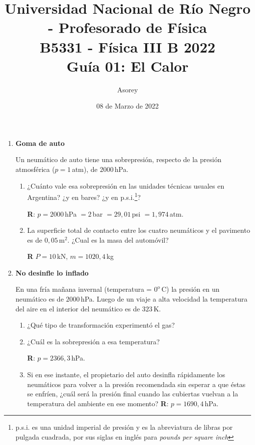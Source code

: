 \documentclass[a4paper,12pt]{article}
\begin{document}
\title{
{\normalsize{Universidad Nacional de Río Negro - Profesorado de Física}}\\
B5331 - Física III B 2022 \\ Guía 01: El Calor}
\author{Asorey }
\date{08 de Marzo de 2022}
\maketitle

\begin{enumerate}
	\setcounter{enumi}{0}

	\item {\bf{Goma de auto}}
		
		Un neumático de auto tiene una sobrepresión, respecto de la presión
		atmosférica ($p=1$\,atm), de $2000$\,hPa.
		\begin{enumerate}
			\item ¿Cuánto vale esa sobrepresión en las unidades técnicas usuales en
				Argentina? ¿y en bares? ¿y en p.s.i.\footnote{p.s.i. es una
				unidad imperial de presión y es la abreviatura de libras por
				pulgada cuadrada, por sus siglas en inglés para {\textit{pounds
				per square inch}}}? 
				
				{\bf R}: $p=2000$\,hPa $= 2$\,bar $= 29,01$\,psi $= 1,974$\,atm.
			\item La superficie total de contacto entre los cuatro neumáticos y
				el pavimento es de $0,05$\,m$^2$. ¿Cual es la masa del
				automóvil?
				
				{\bf R} $P = 10$\,kN, $m=1020,4$\,kg
		\end{enumerate}
	
	\item {\bf{No desinfle lo inflado}}
		
		En una fría mañana invernal (temperatura = $0^\mathrm{o}$\,C) la
		presión en un neumático es de $2000$\,hPa. Luego de un viaje a alta
		velocidad la temperatura del aire en el interior del neumático es de
		$323$\,K.
		\begin{enumerate}
			\item ¿Qué tipo de transformación experimentó el gas?
			\item ¿Cuál es la sobrepresión a esa temperatura?

				{\bf R}: $p=2366,3$\,hPa.
			\item Si en ese instante, el propietario del auto desinfla
				rápidamente los neumáticos para volver a la presión recomendada
				sin esperar a que éstas se enfríen, ¿cuál será la presión final
				cuando las cubiertas vuelvan a la temperatura del ambiente en
				ese momento?
				{\bf R}: $p=1690,4$\,hPa.
		\end{enumerate}
	

\end{enumerate}
\end{document}
